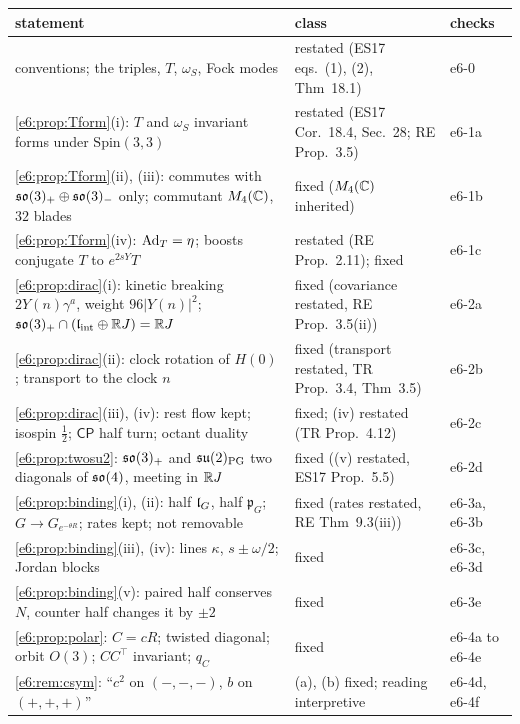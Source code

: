 \begin{table}[htbp]
\centering
\footnotesize
\begin{tabular}{@{}>{\raggedright\arraybackslash}p{8.0cm}>{\raggedright\arraybackslash}p{4.7cm}>{\raggedright\arraybackslash}p{2.1cm}@{}}
\toprule
statement & class & checks\\
\midrule
conventions; the triples, $T$, $\omega_S$, Fock modes & restated (ES17 eqs.~(1), (2), Thm~18.1) & e6-0\\
\cref{e6:prop:Tform}(i): $T$ and $\omega_S$ invariant forms under $\mathrm{Spin}(3,3)$ & restated (ES17 Cor.~18.4, Sec.~28; RE Prop.~3.5) & e6-1a\\
\cref{e6:prop:Tform}(ii), (iii): commutes with $\mathfrak{so}(3)_+\oplus\mathfrak{so}(3)_-$ only; commutant $M_4(\mathbb{C})$, $32$ blades & fixed ($M_4(\mathbb{C})$ inherited) & e6-1b\\
\cref{e6:prop:Tform}(iv): $\operatorname{Ad}_T=\eta$; boosts conjugate $T$ to $e^{2sY}T$ & restated (RE Prop.~2.11); fixed & e6-1c\\
\cref{e6:prop:dirac}(i): kinetic breaking $2Y(n)\gamma^a$, weight $96|Y(n)|^2$; $\mathfrak{so}(3)_+\cap(\mathfrak l_{\rm int}\oplus\mathbb{R} J)=\mathbb{R} J$ & fixed (covariance restated, RE Prop.~3.5(ii)) & e6-2a\\
\cref{e6:prop:dirac}(ii): clock rotation of $H(0)$; transport to the clock $n$ & fixed (transport restated, TR Prop.~3.4, Thm~3.5) & e6-2b\\
\cref{e6:prop:dirac}(iii), (iv): rest flow kept; isospin $\tfrac12$; $\mathsf{CP}$ half turn; octant duality & fixed; (iv) restated (TR Prop.~4.12) & e6-2c\\
\cref{e6:prop:twosu2}: $\mathfrak{so}(3)_+$ and $\mathfrak{su}(2)_{\rm PG}$ two diagonals of $\mathfrak{so}(4)$, meeting in $\mathbb{R} J$ & fixed ((v) restated, ES17 Prop.~5.5) & e6-2d\\
\cref{e6:prop:binding}(i), (ii): half $\mathfrak l_G$, half $\mathfrak p_G$; $G\to G_{e^{-\theta R}}$; rates kept; not removable & fixed (rates restated, RE Thm~9.3(iii)) & e6-3a, e6-3b\\
\cref{e6:prop:binding}(iii), (iv): lines $\kappa$, $s\pm\omega/2$; Jordan blocks & fixed & e6-3c, e6-3d\\
\cref{e6:prop:binding}(v): paired half conserves $N$, counter half changes it by $\pm2$ & fixed & e6-3e\\
\cref{e6:prop:polar}: $C=cR$; twisted diagonal; orbit $O(3)$; $CC^{\!\top}$ invariant; $q_C$ & fixed & e6-4a to e6-4e\\
\cref{e6:rem:csym}: ``$c^2$ on $(-,-,-)$, $b$ on $(+,+,+)$'' & (a), (b) fixed; reading interpretive & e6-4d, e6-4f\\

\end{tabular}
\end{table}
